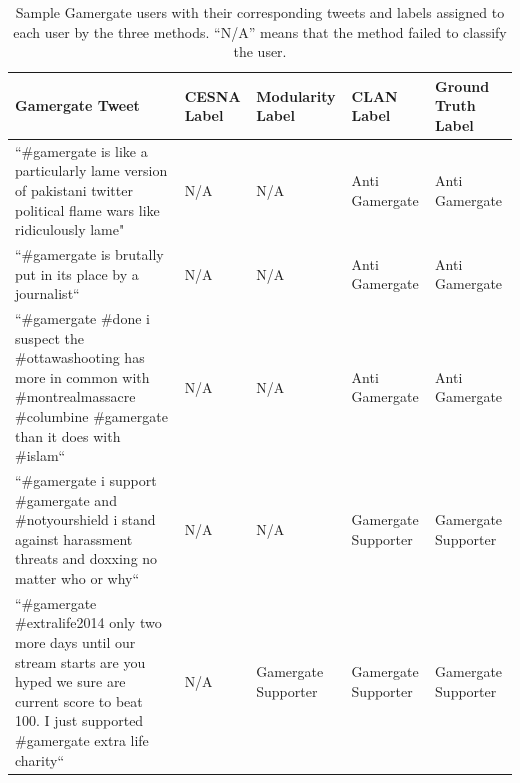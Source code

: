 \begin{table}
\centering
\begin{tabular}{ |p{6.5cm}||p{2.5cm}|p{2.5cm}|p{2.5cm}|p{2.5cm}|  }
 \hline
 Gamergate Tweet&CESNA Label&Modularity Label&CLAN Label&Ground Truth Label\\
 \hline
``\#gamergate is like a particularly lame version of pakistani twitter political flame wars like ridiculously lame"&N/A&N/A&Anti Gamergate &Anti Gamergate\\[0.5pt]
 \hline
 ``\#gamergate is brutally put in its place by a journalist``&N/A&N/A&Anti Gamergate &Anti Gamergate\\[0.5pt]
 \hline
 ``\#gamergate \#done i suspect the \#ottawashooting has more in common with \#montrealmassacre \#columbine \#gamergate than it does with \#islam``&N/A&N/A&Anti Gamergate &Anti Gamergate\\[0.5pt]
  \hline
 ``\#gamergate i support \#gamergate and \#notyourshield i stand against harassment threats and doxxing no matter who or why``&N/A&N/A&Gamergate Supporter&Gamergate Supporter\\[0.5pt]
 \hline
 ``\#gamergate \#extralife2014 only two more days until our stream starts are you hyped we sure are current score to beat 100. I just supported \#gamergate extra life charity``&N/A&Gamergate Supporter&Gamergate Supporter&Gamergate Supporter\\[0.5pt]
 \hline
\end{tabular}
\caption{Sample Gamergate users with their corresponding tweets and labels assigned to each user by the three methods. ``N/A'' means that the method failed to classify the user.}
\label{gamergateexamples}
\end{table}
